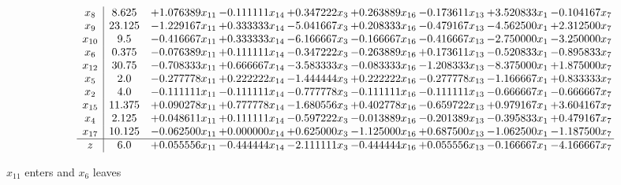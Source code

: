 \documentclass[10pt]{article}
\begin{document}
 \[\begin{array}{c| c c@{\hskip 2pt} c@{\hskip 2pt} c@{\hskip 2pt} c@{\hskip 2pt} c@{\hskip 2pt} c@{\hskip 2pt} c@{\hskip 2pt} }
 x_{8}   &  8.625 & + 1.076389 x_{11} & -0.111111 x_{14} & + 0.347222 x_{3} & + 0.263889 x_{16} & -0.173611 x_{13} & + 3.520833 x_{1} & -0.104167 x_{7}\\
 x_{9}   &  23.125 & -1.229167 x_{11} & + 0.333333 x_{14} & -5.041667 x_{3} & + 0.208333 x_{16} & -0.479167 x_{13} & -4.562500 x_{1} & + 2.312500 x_{7}\\
 x_{10}   &  9.5 & -0.416667 x_{11} & + 0.333333 x_{14} & -6.166667 x_{3} & -0.166667 x_{16} & -0.416667 x_{13} & -2.750000 x_{1} & -3.250000 x_{7}\\
 x_{6}   &  0.375 & -0.076389 x_{11} & + 0.111111 x_{14} & -0.347222 x_{3} & -0.263889 x_{16} & + 0.173611 x_{13} & -0.520833 x_{1} & -0.895833 x_{7}\\
 x_{12}   &  30.75 & -0.708333 x_{11} & + 0.666667 x_{14} & -3.583333 x_{3} & -0.083333 x_{16} & -1.208333 x_{13} & -8.375000 x_{1} & + 1.875000 x_{7}\\
 x_{5}   &  2.0 & -0.277778 x_{11} & + 0.222222 x_{14} & -1.444444 x_{3} & + 0.222222 x_{16} & -0.277778 x_{13} & -1.166667 x_{1} & + 0.833333 x_{7}\\
 x_{2}   &  4.0 & -0.111111 x_{11} & -0.111111 x_{14} & -0.777778 x_{3} & -0.111111 x_{16} & -0.111111 x_{13} & -0.666667 x_{1} & -0.666667 x_{7}\\
 x_{15}   &  11.375 & + 0.090278 x_{11} & + 0.777778 x_{14} & -1.680556 x_{3} & + 0.402778 x_{16} & -0.659722 x_{13} & + 0.979167 x_{1} & + 3.604167 x_{7}\\
 x_{4}   &  2.125 & + 0.048611 x_{11} & + 0.111111 x_{14} & -0.597222 x_{3} & -0.013889 x_{16} & -0.201389 x_{13} & -0.395833 x_{1} & + 0.479167 x_{7}\\
 x_{17}   &  10.125 & -0.062500 x_{11} & + 0.000000 x_{14} & + 0.625000 x_{3} & -1.125000 x_{16} & + 0.687500 x_{13} & -1.062500 x_{1} & -1.187500 x_{7}\\
\hline
z    &  6.0 & + 0.055556 x_{11} & -0.444444 x_{14} & -2.111111 x_{3} & -0.444444 x_{16} & + 0.055556 x_{13} & -0.166667 x_{1} & -4.166667 x_{7}\\
\end{array}\]


 $ x_{11} $ enters and $ x_{6} $ leaves 
\end{document}
